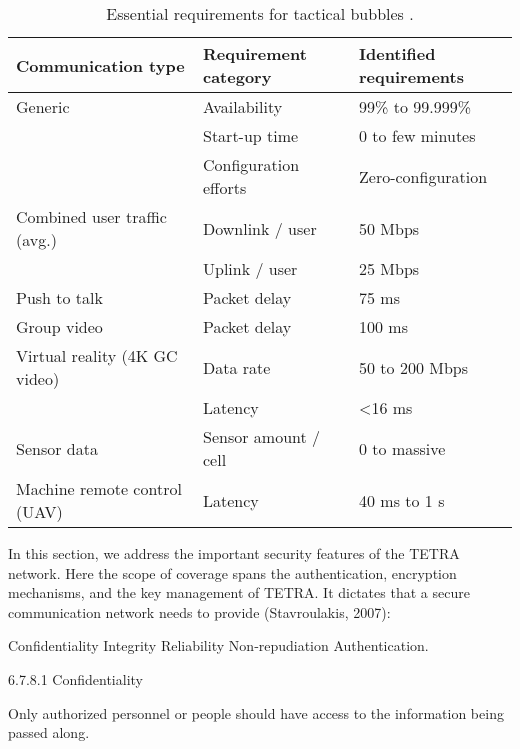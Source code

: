 \documentclass[english, 12pt, a4paper, elec, utf8, a-1b, online]{aaltothesis}
\begin{document}
\begin{table}[]
  \centering
  \caption{Essential requirements for tactical bubbles \cite{heikkila2021field}.}
  \begin{tabular}{@{}lll@{}}
  \toprule
  Communication type            & Requirement category  & Identified requirements \\ \midrule
  Generic                       & Availability          & 99\% to 99.999\%        \\
                                & Start-up time         & 0 to few minutes        \\
                                & Configuration efforts & Zero-configuration      \\
  Combined user traffic (avg.)  & Downlink / user       & 50 Mbps                 \\
                                & Uplink / user         & 25 Mbps                 \\
  Push to talk                  & Packet delay          & 75 ms                   \\
  Group video                   & Packet delay          & 100 ms                  \\
  Virtual reality (4K GC video) & Data rate             & 50 to 200 Mbps          \\
                                & Latency               & \textless 16 ms         \\
  Sensor data                   & Sensor amount / cell  & 0 to massive            \\
  Machine remote control (UAV)  & Latency               & 40 ms to 1 s            \\ \bottomrule
  \end{tabular}
  \label{table-mcx-requirements}
\end{table}


In this section, we address the important security features of the TETRA network.
Here the scope of coverage spans the authentication, encryption mechanisms, and the key management of TETRA.
It dictates that a secure communication network needs to provide (Stavroulakis, 2007):

    Confidentiality
    Integrity
    Reliability
    Non‐repudiation
    Authentication.

6.7.8.1 Confidentiality

    Only authorized personnel or people should have access to the information being passed along.
\end{document}
